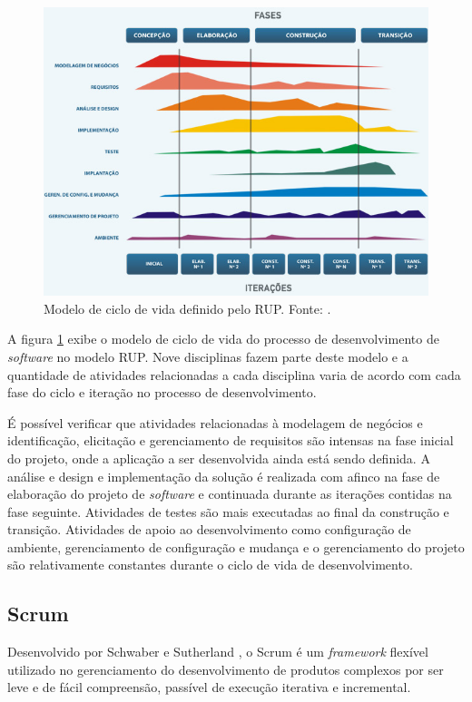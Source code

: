 \begin{figure}[htb]
\centering
\includegraphics[scale=0.8]{figuras/ciclo_rup.jpg}
\caption{Modelo de ciclo de vida definido pelo RUP. Fonte: \cite{henrique_rup_2015}.}
\label{ciclo_rup}
\end{figure}

A figura \ref{ciclo_rup} exibe o modelo de ciclo de vida do processo de desenvolvimento de \textit{software} no modelo RUP. Nove disciplinas fazem parte deste modelo e a quantidade de atividades relacionadas a cada disciplina varia de acordo com cada fase do ciclo e iteração no processo de desenvolvimento.

É possível verificar que atividades relacionadas à modelagem de negócios e identificação, elicitação e gerenciamento de requisitos são intensas na fase inicial do projeto, onde a aplicação a ser desenvolvida ainda está sendo definida. A análise e design e implementação da solução é realizada com afinco na fase de elaboração do projeto de \textit{software} e continuada durante  as iterações contidas na fase seguinte. Atividades de testes são mais executadas ao final da construção e transição. Atividades de apoio ao desenvolvimento como configuração de ambiente, gerenciamento de configuração e mudança e o gerenciamento do projeto são relativamente constantes durante o ciclo de vida de desenvolvimento.

\subsection{Scrum}
Desenvolvido por Schwaber e Sutherland \cite{schwaber_guia_2013}, o Scrum é um \textit{framework} flexível utilizado no gerenciamento do desenvolvimento de produtos complexos por ser leve e de fácil compreensão, passível de execução iterativa e incremental.

